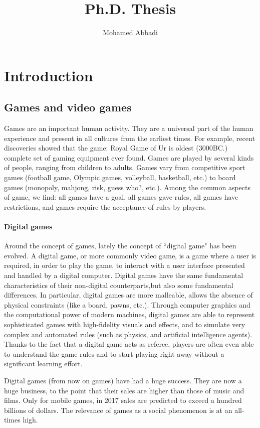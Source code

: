 \documentclass[10pt,a4paper]{article}
\author{Mohamed Abbadi}
\title{Ph.D. Thesis}
\begin{document}
\maketitle

\section{Introduction}
\subsection{Games and video games}
Games are an important human activity. They are a universal part of the human experience and present in all cultures from the earliest times. For example, recent discoveries showed that the game: Royal Game of Ur is oldest (3000BC.) complete set of gaming equipment ever found. Games are played by several kinds of people, ranging from children to adults. Games vary from competitive sport games (football game, Olympic games, volleyball, basketball, etc.) to board games (monopoly, mahjong, risk, guess who?, etc.).
Among the common aspects of game, we find: all games have a goal, all games gave rules, all games have restrictions, and games require the acceptance of rules by players.

\paragraph{Digital games}
Around the concept of games, lately the concept of ``digital game" has been evolved. A digital game, or more commonly video game, is a game where a user is required, in order to play the game, to interact with a user interface presented and handled by a digital computer. Digital games have the same fundamental characteristics of their non-digital counterparts,but also some fundamental differences. In particular, digital games are more malleable, allows the absence of physical constraints (like a board, pawns, etc.). Through computer graphics and the computational power of modern machines, digital games are able to represent sophisticated games with high-fidelity visuals and effects, and to simulate very complex and automated rules (such as physics, and artificial intelligence agents). Thanks to the fact that a digital game acts as referee, players are often even able to understand the game rules and to start playing right away without a significant learning effort.

Digital games (from now on games) have had a huge success. They are now a huge business, to the point that their sales are higher than those of music and films. Only for mobile games, in 2017 sales are predicted to exceed a hundred billions of dollars. The relevance of games as a social phenomenon is at an all-times high.
\end{document}
